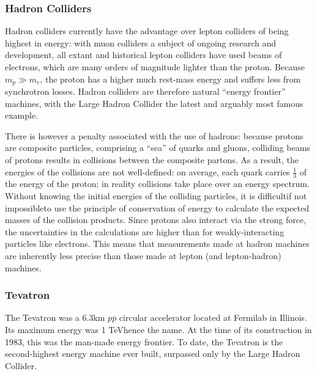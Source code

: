 \subsubsection{Hadron Colliders}
Hadron colliders currently have the advantage over lepton colliders of being highest in energy: with muon colliders a subject of ongoing research and development\cite{Fermi:Muon:Online}, all extant and historical lepton colliders have used beams of electrons, which are many orders of magnitude lighter than the proton. Because $m_{p}\gg m_{e}$, the proton has a higher much rest-mass energy and suffers less from synchrotron losses. Hadron colliders are therefore natural ``energy frontier'' machines, with the Large Hadron Collider the latest and arguably most famous example.

There is however a penalty associated with the use of hadrons: because protons are composite particles, comprising a ``sea'' of quarks and gluons, colliding beams of protons results in collisions between the composite partons. As a result, the energies of the collisions are not well-defined: on average, each quark carries $\frac{1}{3}$ of the energy of the proton; in reality collisions take place over an energy spectrum. Without knowing the initial energies of the colliding particles, it is difficult\textemdash if not impossible\textemdash to use the principle of conservation of energy to calculate the expected masses of the collision products\cite{Butterworth:Interview}. Since protons also interact via the strong force, the uncertainties in the calculations are higher than for weakly-interacting particles like electrons\cite{Thorne:Interview}. This means that measurements made at hadron machines are inherently less precise than those made at lepton (and lepton-hadron) machines.
\subsubsection{Tevatron}
The Tevatron was a 6.3km $p\overline{p}$ circular accelerator located at Fermilab in Illinois. Its maximum energy was 1 TeV\textemdash hence the name. At the time of its construction in 1983, this was the man-made energy frontier. To date, the Tevatron is the second-highest energy machine ever built, surpassed only by the Large Hadron Collider.

